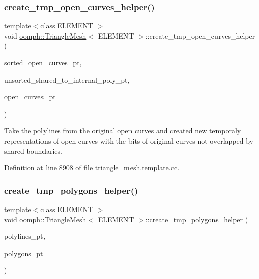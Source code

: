 \subsubsection{\texorpdfstring{create\+\_\+tmp\+\_\+open\+\_\+curves\+\_\+helper()}{create\_tmp\_open\_curves\_helper()}}
{\footnotesize\ttfamily template$<$class E\+L\+E\+M\+E\+NT $>$ \\
void \hyperlink{classoomph_1_1TriangleMesh}{oomph\+::\+Triangle\+Mesh}$<$ E\+L\+E\+M\+E\+NT $>$\+::create\+\_\+tmp\+\_\+open\+\_\+curves\+\_\+helper (\begin{DoxyParamCaption}\item[{Vector$<$ Vector$<$ Triangle\+Mesh\+Poly\+Line $\ast$$>$ $>$ \&}]{sorted\+\_\+open\+\_\+curves\+\_\+pt,  }\item[{Vector$<$ Triangle\+Mesh\+Poly\+Line $\ast$$>$ \&}]{unsorted\+\_\+shared\+\_\+to\+\_\+internal\+\_\+poly\+\_\+pt,  }\item[{Vector$<$ Triangle\+Mesh\+Open\+Curve $\ast$$>$ \&}]{open\+\_\+curves\+\_\+pt }\end{DoxyParamCaption})\hspace{0.3cm}{\ttfamily [protected]}}



Take the polylines from the original open curves and created new temporaly representations of open curves with the bits of original curves not overlapped by shared boundaries. 



Definition at line 8908 of file triangle\+\_\+mesh.\+template.\+cc.

\mbox{\label{classoomph_1_1TriangleMesh_a12e4d6af85176be0a050ca7b0644a69b}} 
\subsubsection{\texorpdfstring{create\+\_\+tmp\+\_\+polygons\+\_\+helper()}{create\_tmp\_polygons\_helper()}}
{\footnotesize\ttfamily template$<$class E\+L\+E\+M\+E\+NT $>$ \\
void \hyperlink{classoomph_1_1TriangleMesh}{oomph\+::\+Triangle\+Mesh}$<$ E\+L\+E\+M\+E\+NT $>$\+::create\+\_\+tmp\+\_\+polygons\+\_\+helper (\begin{DoxyParamCaption}\item[{Vector$<$ Vector$<$ Triangle\+Mesh\+Poly\+Line $\ast$$>$ $>$ \&}]{polylines\+\_\+pt,  }\item[{Vector$<$ Triangle\+Mesh\+Polygon $\ast$$>$ \&}]{polygons\+\_\+pt }\end{DoxyParamCaption})\hspace{0.3cm}{\ttfamily [protected]}}



